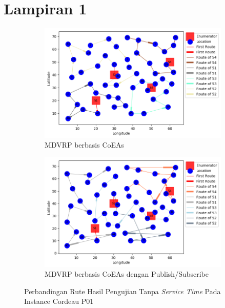 \chapter*{Lampiran 1}
\label{ch:test_result_cordeau_notw}


\begin{figure}[H]
	\centering
	\begin{subfigure}[t]{\textwidth}
		\centering
		\includegraphics[width=\textwidth]{Resources/Images/cordeau_p01/cordeau_p01_notw_coes}
		\caption{MDVRP berbasis CoEAs}
		\label{fig:cordeau_p01_notw_coes}
	\end{subfigure}
	\begin{subfigure}[t]{\textwidth}
		\centering
		\includegraphics[width=\textwidth]{Resources/Images/cordeau_p01/cordeau_p01_notw_pubsub_coes}
		\caption{MDVRP berbasis CoEAs dengan Publish/Subscribe}
		\label{fig:cordeau_p01_notw_pubsub_coes}
	\end{subfigure}
	\caption{Perbandingan Rute Hasil Pengujian Tanpa \textit{Service Time} Pada Instance Cordeau P01}
	\label{fig:cordeau_p01_notw}
\end{figure}



